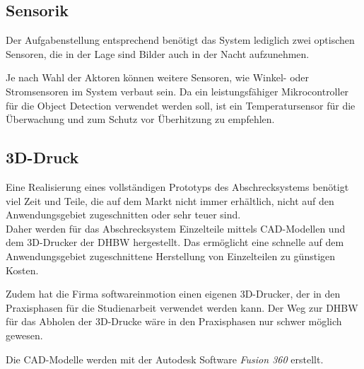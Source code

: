 \subsection{Sensorik}

Der Aufgabenstellung entsprechend benötigt das System lediglich zwei optischen Sensoren, die in der Lage sind Bilder auch in der Nacht aufzunehmen.

Je nach Wahl der Aktoren können weitere Sensoren, wie Winkel- oder Stromsensoren im System verbaut sein. Da ein leistungsfähiger Mikrocontroller für die Object Detection verwendet werden soll, ist ein Temperatursensor für die Überwachung und zum Schutz vor Überhitzung zu empfehlen.

\subsection{3D-Druck}

Eine Realisierung eines vollständigen Prototyps des Abschrecksystems benötigt viel Zeit und Teile, die auf dem Markt nicht immer erhältlich, nicht auf den Anwendungsgebiet zugeschnitten oder sehr teuer sind.\\
Daher werden für das Abschrecksystem Einzelteile mittels CAD-Modellen und dem 3D-Drucker der DHBW hergestellt. Das ermöglicht eine schnelle auf dem Anwendungsgebiet zugeschnittene Herstellung von Einzelteilen zu günstigen Kosten.

Zudem hat die Firma softwareinmotion einen eigenen 3D-Drucker, der in den Praxisphasen für die Studienarbeit verwendet werden kann. Der Weg zur DHBW für das Abholen der 3D-Drucke wäre in den Praxisphasen nur schwer möglich gewesen.

Die CAD-Modelle werden mit der Autodesk Software \textit{Fusion 360} erstellt.







